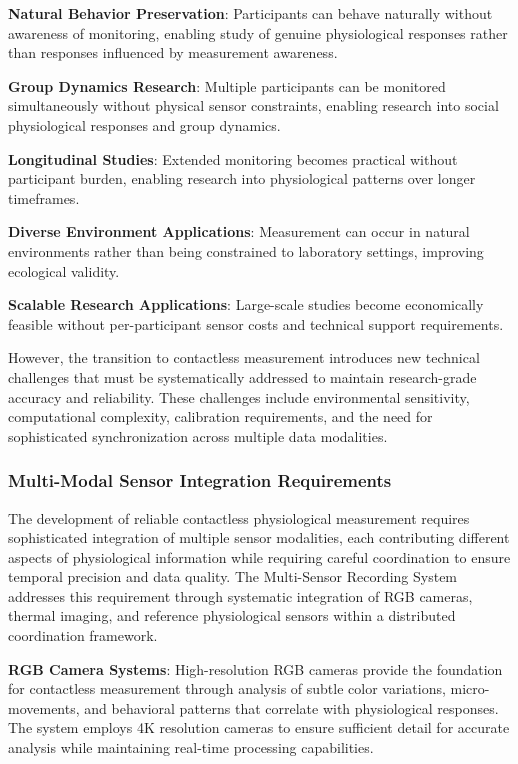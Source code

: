 \documentclass[11pt,a4paper]{report}
\begin{document}
\textbf{Natural Behavior Preservation}: Participants can behave naturally without awareness of monitoring, enabling study of
genuine physiological responses rather than responses influenced by measurement awareness.

\textbf{Group Dynamics Research}: Multiple participants can be monitored simultaneously without physical sensor constraints,
enabling research into social physiological responses and group dynamics.

\textbf{Longitudinal Studies}: Extended monitoring becomes practical without participant burden, enabling research into
physiological patterns over longer timeframes.

\textbf{Diverse Environment Applications}: Measurement can occur in natural environments rather than being constrained to
laboratory settings, improving ecological validity.

\textbf{Scalable Research Applications}: Large-scale studies become economically feasible without per-participant sensor
costs and technical support requirements.

However, the transition to contactless measurement introduces new technical challenges that must be systematically
addressed to maintain research-grade accuracy and reliability. These challenges include environmental sensitivity,
computational complexity, calibration requirements, and the need for sophisticated synchronization across multiple data
modalities.

\subsubsection{Multi-Modal Sensor Integration Requirements}

The development of reliable contactless physiological measurement requires sophisticated integration of multiple sensor
modalities, each contributing different aspects of physiological information while requiring careful coordination to
ensure temporal precision and data quality. The Multi-Sensor Recording System addresses this requirement through
systematic integration of RGB cameras, thermal imaging, and reference physiological sensors within a distributed
coordination framework.

\textbf{RGB Camera Systems}: High-resolution RGB cameras provide the foundation for contactless measurement through analysis
of subtle color variations, micro-movements, and behavioral patterns that correlate with physiological responses. The
system employs 4K resolution cameras to ensure sufficient detail for accurate analysis while maintaining real-time
processing capabilities.
\end{document}
